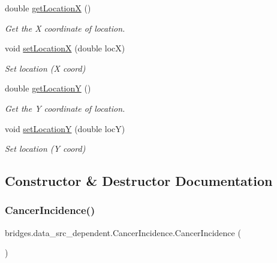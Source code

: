 \begin{DoxyCompactItemize}
double \mbox{\hyperlink{classbridges_1_1data__src__dependent_1_1_cancer_incidence_a24aa8144dcacd93a26c3c033471666df}{get\+LocationX}} ()
\begin{DoxyCompactList}\small\item\em Get the X coordinate of location. \end{DoxyCompactList}\item 
void \mbox{\hyperlink{classbridges_1_1data__src__dependent_1_1_cancer_incidence_a384149c413173fba51adad1b1769797a}{set\+LocationX}} (double locX)
\begin{DoxyCompactList}\small\item\em Set location (X coord) \end{DoxyCompactList}\item 
double \mbox{\hyperlink{classbridges_1_1data__src__dependent_1_1_cancer_incidence_a53b56a9931a1d02ee356c6258e245aa8}{get\+LocationY}} ()
\begin{DoxyCompactList}\small\item\em Get the Y coordinate of location. \end{DoxyCompactList}\item 
void \mbox{\hyperlink{classbridges_1_1data__src__dependent_1_1_cancer_incidence_a14c6921a71834c14d561bc7f2aa8a18e}{set\+LocationY}} (double locY)
\begin{DoxyCompactList}\small\item\em Set location (Y coord) \end{DoxyCompactList}\end{DoxyCompactItemize}


\subsection{Constructor \& Destructor Documentation}
\mbox{\label{classbridges_1_1data__src__dependent_1_1_cancer_incidence_a92db1eb4292c77f07619019587caf5cc}} 
\subsubsection{\texorpdfstring{CancerIncidence()}{CancerIncidence()}\hspace{0.1cm}{\footnotesize\ttfamily [1/2]}}
{\footnotesize\ttfamily bridges.\+data\+\_\+src\+\_\+dependent.\+Cancer\+Incidence.\+Cancer\+Incidence (\begin{DoxyParamCaption}{ }\end{DoxyParamCaption})}

